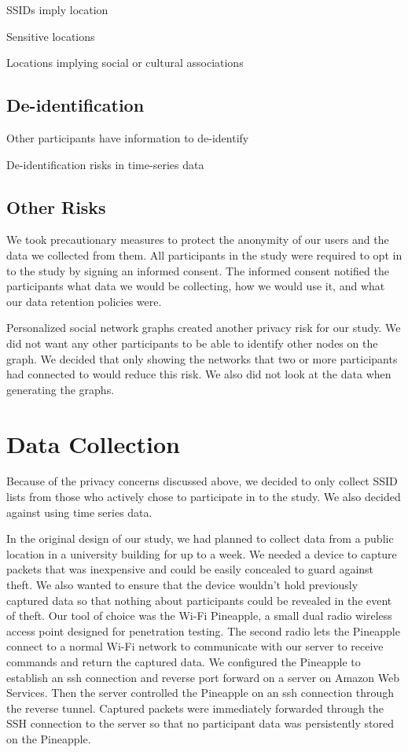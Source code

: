 \documentclass[letterpaper,twocolumn,10pt]{article}
\begin{document}
SSIDs imply location

Sensitive locations

Locations implying social or cultural associations



\subsection{De-identification}
Other participants have information to de-identify

De-identification risks in time-series data

\subsection{Other Risks}
We took precautionary measures to protect the anonymity of our users and the data we collected from them. All participants in the study were required to opt in to the study by signing an informed consent. The informed consent notified the participants what data we would be collecting, how we would use it, and what our data retention policies were. 

Personalized social network graphs created another privacy risk for our study. We did not want any other participants to be able to identify other nodes on the graph. We decided that only showing the networks that two or more participants had connected to would reduce this risk. We also did not look at the data when generating the graphs.



\section{Data Collection}
Because of the privacy concerns discussed above, we decided to only collect SSID lists from those who actively chose to participate in to the study. We also decided against using time series data.

In the original design of our study, we had planned to collect data from a public location in a university building for up to a week. We needed a device to capture packets that was inexpensive and could be easily concealed to guard against theft. We also wanted to ensure that the device wouldn't hold previously captured data so that nothing about participants could be revealed in the event of theft. Our tool of choice was the Wi-Fi Pineapple, a small dual radio wireless access point designed for penetration testing. The second radio lets the Pineapple connect to a normal Wi-Fi network to communicate with our server to receive commands and return the captured data. We configured the Pineapple to establish an ssh connection and reverse port forward on a server on Amazon Web Services. Then the server controlled the Pineapple on an ssh connection through the reverse tunnel. Captured packets were immediately forwarded through the SSH connection to the server so that no participant data was persistently stored on the Pineapple.
\end{document}
